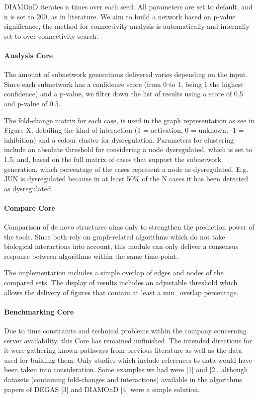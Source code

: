 DIAMOnD iterates n times over each seed. All parameters are set to default, and n is set to 200, as in literature. We aim to build a network based on p-value significance, the method for connectivity analysis is automatically and internally set to over-connectivity search.

\paragraph{Analysis Core}
The amount of subnetwork generations delivered varies depending on the input. Since each subnetwork has a confidence score (from 0 to 1, being 1 the highest confidence) and a p-value, we filter down the list of results using a score of 0.5 and p-value of 0.5.

The fold-change matrix for each case, is used in the graph representation as see in Figure X, detailing the kind of interaction (1 = activation, 0 = unknown, -1 = inhibition) and a colour cluster for dysregulation. Parameters for clustering include an absolute threshold for considering a node dysregulated, which is set to 1.5, and, based on the full matrix of cases that support the subnetwork generation, which percentage of the cases represent a node as dysregulated. E.g. JUN is dysregulated because in at least 50\% of the N cases it has been detected as dysregulated.


\paragraph{Compare Core}
Comparison of de novo structures aims only to strengthen the prediction power of the tools. Since both rely on graph-related algorithms which do not take biological interactions into account, this module can only deliver a consensus response between algorithms within the same time-point.


The implementation includes a simple overlap of edges and nodes of the compared sets. The display of results includes an adjustable threshold which allows the delivery of figures that contain at least a min\_overlap percentage.


\paragraph{Benchmarking Core}
Due to time constraints and technical problems within the company concerning server availability, this Core has remained unfinished.
The intended directions for it were gathering known pathways from previous literature as well as the data used for building them. Only studies which include references to data would have been taken into consideration. Some examples we had were [1] and [2], although datasets (containing fold-changes and interactions) available in the algorithms papers of DEGAS [3] and DIAMOnD [4] were a simple solution. 

